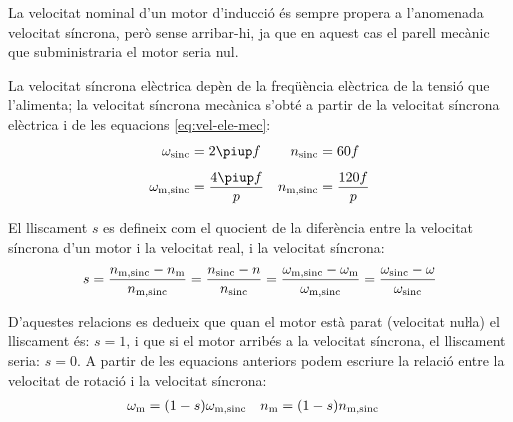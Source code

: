 La velocitat nominal d'un motor d'inducció és sempre propera a l'anomenada velocitat síncrona, però sense arribar-hi, ja que en aquest cas el parell mecànic que subministraria el motor seria nul.

La velocitat síncrona elèctrica depèn de la freqüència elèctrica de la tensió que l'alimenta; la velocitat síncrona mecànica s'obté a partir de la velocitat síncrona elèctrica i de  les equacions \eqref{eq:vel-ele-mec}:
\begin{subequations}\index{motors d'inducció!velocitat síncrona}
\begin{align}
    \omega\ped{sinc} &= 2 \piup f & n\ped{sinc} &= 60 f \\[1ex]
    \omega\ped{m,sinc} &= \frac{4 \piup f}{p} & n\ped{m,sinc} &= \frac{120 f}{p}\label{eq:vel-mec-sinc}
\end{align}
\end{subequations}

El lliscament $s$ es defineix com el quocient de la diferència entre la velocitat síncrona d'un motor i la velocitat real, i la velocitat síncrona:
\begin{equation}\label{eq:lliscament}\index{lliscament}
    s = \frac{n\ped{m,sinc}-n\ped{m}}{n\ped{m,sinc}} =
    \frac{n\ped{sinc}-n}{n\ped{sinc}} =
    \frac{\omega\ped{m,sinc}-\omega\ped{m}}{\omega\ped{m,sinc}} =
    \frac{\omega\ped{sinc}-\omega}{\omega\ped{sinc}}
\end{equation}

D'aquestes relacions es dedueix que quan el motor està parat (velocitat nuŀla) el lliscament és: $s=1$, i que si el motor arribés a la velocitat síncrona, el lliscament seria: $s=0$. A partir de les equacions anteriors podem escriure la relació entre la velocitat de rotació i la velocitat síncrona:
\begin{align}
    \omega_\mathrm{m} &= (1-s) \omega_\mathrm{m,sinc} & n_\mathrm{m} &= (1-s) n_\mathrm{m,sinc} \label{eq:wm-wsinc}
\end{align}



